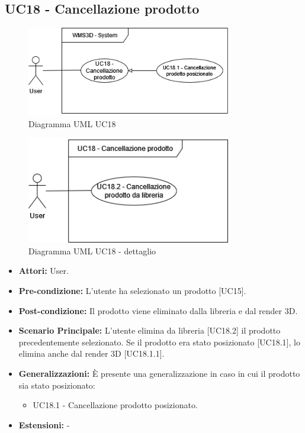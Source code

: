 \subsection{UC18 - Cancellazione prodotto}
\begin{figure}[H]
  \centering
  \includegraphics[width=0.8\textwidth]{UC_diagrams_11-20/UC18_sys.drawio.png}
   \caption{Diagramma UML UC18}
\end{figure}
\begin{figure}[H]
  \centering
  \includegraphics[width=0.8\textwidth]{UC_diagrams_11-20/UC18.drawio.png}
   \caption{Diagramma UML UC18 - dettaglio}
\end{figure}
\begin{itemize}
    \item \textbf{Attori:} User.
    \item \textbf{Pre-condizione:} L'utente ha selezionato un prodotto [UC15].
    \item \textbf{Post-condizione:} Il prodotto viene eliminato dalla libreria e dal render 3D.
    \item \textbf{Scenario Principale:} L'utente elimina da libreria [UC18.2] il prodotto precedentemente selezionato. Se il prodotto era stato posizionato [UC18.1], lo elimina anche dal render 3D [UC18.1.1].
    \item \textbf{Generalizzazioni:} È presente una generalizzazione in caso in cui il prodotto sia stato posizionato:
    \begin{itemize}
        \item UC18.1 - Cancellazione prodotto posizionato.
    \end{itemize}
    \item \textbf{Estensioni:} -
\end{itemize}


